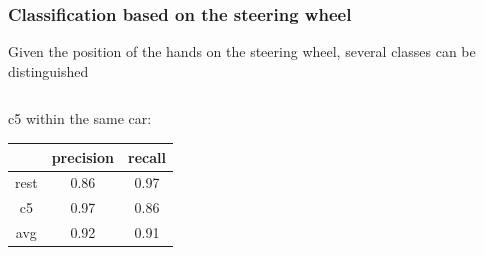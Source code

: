 \documentclass{beamer}
\begin{document}
	
    
    \begin{frame}
    	\frametitle{Classification based on the steering wheel}
    	Given the position of the hands on the steering wheel, several classes can be distinguished
    	\begin{columns}
    		\begin{column}{0.5\textwidth}
    			\centering
				c5 within the same car:
    			\begin{tabular}{c|cc}
    				& precision & recall \\ 
    				\hline rest & 0.86 & 0.97 \\ 
		    		c5 & 0.97 & 0.86 \\ 
    				\hline avg & 0.92 & 0.91 \\  
    			\end{tabular} 
    			

\end{column}
\end{columns}
\end{frame}
\end{document}
